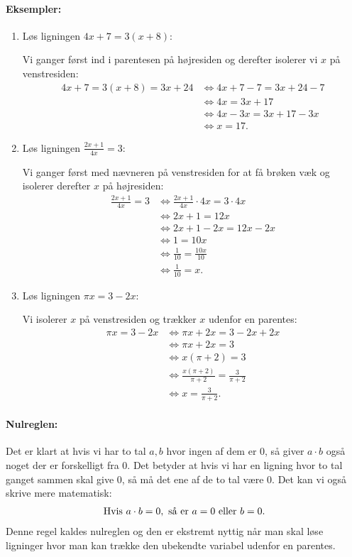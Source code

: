 \paragraph*{Eksempler:}
\begin{enumerate}
\item Løs ligningen $4x+7 = 3(x+8)$:

Vi ganger først ind i parentesen på højresiden og derefter isolerer vi $x$ på venstresiden:
\begin{align*}
4x+7=3(x+8)= 3x+24 &\Leftrightarrow 4x+7-7 = 3x+24-7 \\
&\Leftrightarrow 4x = 3x + 17 \\
&\Leftrightarrow 4x - 3x = 3x + 17 - 3x \\
&\Leftrightarrow x = 17.
\end{align*}
\item Løs ligningen $\frac{2x+1}{4x}=3$:

Vi ganger først med nævneren på venstresiden for at få brøken væk og isolerer derefter $x$ på højresiden:
\begin{align*}
\frac{2x+1}{4x}=3 &\Leftrightarrow \frac{2x+1}{4x} \cdot 4x = 3 \cdot 4x \\
&\Leftrightarrow 2x+1 = 12x \\
&\Leftrightarrow 2x +1 - 2x = 12x - 2x \\
&\Leftrightarrow 1 = 10x\\
&\Leftrightarrow \frac{1}{10} = \frac{10x}{10} \\
&\Leftrightarrow \frac{1}{10} = x. 
\end{align*}
\item Løs ligningen $\pi x = 3-2x$:

Vi isolerer $x$ på venstresiden og trækker $x$ udenfor en parentes:
\begin{align*}
\pi x = 3-2x &\Leftrightarrow \pi x +2x = 3 - 2x + 2x \\
&\Leftrightarrow \pi x + 2x = 3 \\
&\Leftrightarrow x(\pi+2) = 3 \\
&\Leftrightarrow \frac{x(\pi + 2)}{\pi + 2} = \frac{3}{\pi +2} \\
&\Leftrightarrow x = \frac{3 }{\pi +2}.
\end{align*}
\end{enumerate}

\paragraph*{Nulreglen:}
Det er klart at hvis vi har to tal $a,b$ hvor ingen af dem er $0$, så giver $a \cdot b$ også noget der er forskelligt fra $0$. Det betyder at hvis vi har en ligning hvor to tal ganget sammen skal give $0$, så må det ene af de to tal være $0$. Det kan vi også skrive mere matematisk:
\begin{align*}
\textup{Hvis }a \cdot b = 0, \textup{ så er } a=0 \textup{ eller } b=0.
\end{align*}
Denne regel kaldes nulreglen og den er ekstremt nyttig når man skal løse ligninger hvor man kan trække den ubekendte variabel udenfor en parentes.

